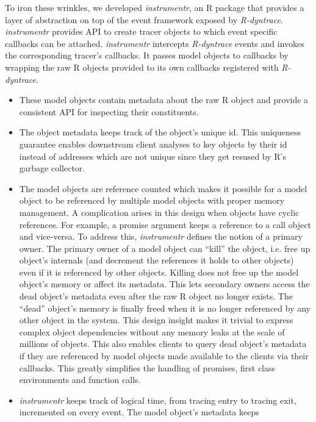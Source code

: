 \documentclass[screen,acmsmall]{acmart}
\begin{document}

To iron these wrinkles, we developed \emph{instrumentr}, an R package that
provides a layer of abstraction on top of the event framework exposed by
\emph{R-dyntrace}. \emph{instrumentr} provides API to create tracer objects to
which event specific callbacks can be attached. \emph{instrumentr} intercepts
\emph{R-dyntrace} events and invokes the corresponding tracer's callbacks. It
passes model objects to callbacks by wrapping the raw R objects provided to
its own callbacks registered with \emph{R-dyntrace}.
\begin{itemize}
\item These model objects contain metadata about the raw R object and provide a
  consistent API for inspecting their constituents.
\item The object metadata keeps track of the object's unique id. This uniqueness
  guarantee enables downstream client analyses to key objects by their id
  instead of addresses which are not unique since they get resused by R's
  garbage collector.
\item The model objects are reference counted which makes it possible for a
  model object to be referenced by multiple model objects with proper memory
  management. A complication arises in this design when objects have cyclic
  references. For example, a promise argument keeps a reference to a call object
  and vice-versa. To address this, \emph{instrumentr} defines the notion of a
  primary owner. The primary owner of a model object can ``kill'' the object,
  i.e. free up object's internals (and decrement the references it holds to
  other objects) even if it is referenced by other objects. Killing does not
  free up the model object's memory or affect its metadata. This lets secondary
  owners access the dead object's metadata even after the raw R object no longer
  exists. The ``dead'' object's memory is finally freed when it is no longer
  referenced by any other object in the system. This design insight makes it
  trivial to express complex object dependencies without any memory leaks at the
  scale of millions of objects. This also enables clients to query dead object's
  metadata if they are referenced by model objects made available to the clients
  via their callbacks. This greatly simplifies the handling of promises, first
  class environments and function calls.
\item \emph{instrumentr} keeps track of logical time, from tracing entry to
tracing exit, incremented on every event. The model object's metadata keeps

\end{itemize}
\end{document}

